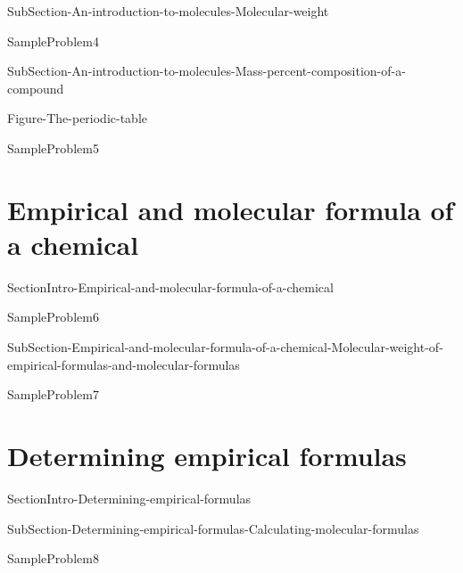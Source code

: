 \documentclass[main.tex]{subfiles}
\begin{document}
\sloppy
\begin{description}
{SubSection-An-introduction-to-molecules-Molecular-weight}


 
{SampleProblem4}


{SubSection-An-introduction-to-molecules-Mass-percent-composition-of-a-compound}

 {Figure-The-periodic-table}
 

{SampleProblem5}



\end{description}





\section{Empirical and molecular formula of a chemical}
{SectionIntro-Empirical-and-molecular-formula-of-a-chemical}

{SampleProblem6}







\sloppy
\begin{description}

{SubSection-Empirical-and-molecular-formula-of-a-chemical-Molecular-weight-of-empirical-formulas-and-molecular-formulas}


{SampleProblem7}

\end{description}









\section{Determining empirical formulas}
{SectionIntro-Determining-empirical-formulas}
\sloppy
\begin{description}

{SubSection-Determining-empirical-formulas-Calculating-molecular-formulas}


{SampleProblem8}


\end{description}
\end{document}
